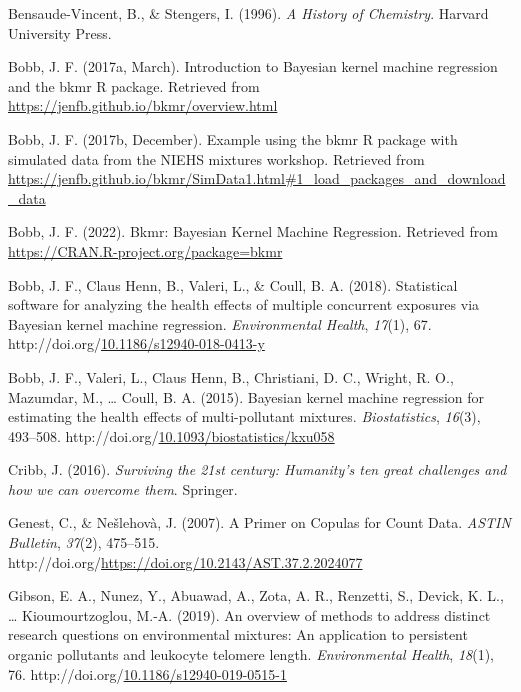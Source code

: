 \documentclass[12pt, twoside]{amherstthesis}
\newenvironment{CSLReferences}[2]%
  {}%
  {\par}
\begin{document}
\begin{CSLReferences}{1}{0}
\leavevmode{}%
Bensaude-Vincent, B., \& Stengers, I. (1996). \emph{A {History} of {Chemistry}}. Harvard University Press.

\leavevmode{}%
Bobb, J. F. (2017a, March). Introduction to {Bayesian} kernel machine regression and the bkmr {R} package. Retrieved from \url{https://jenfb.github.io/bkmr/overview.html}

\leavevmode{}%
Bobb, J. F. (2017b, December). Example using the bkmr {R} package with simulated data from the {NIEHS} mixtures workshop. Retrieved from \url{https://jenfb.github.io/bkmr/SimData1.html\#1_load_packages_and_download_data}

\leavevmode{}%
Bobb, J. F. (2022). Bkmr: {Bayesian} {Kernel} {Machine} {Regression}. Retrieved from \url{https://CRAN.R-project.org/package=bkmr}

\leavevmode{}%
Bobb, J. F., Claus Henn, B., Valeri, L., \& Coull, B. A. (2018). Statistical software for analyzing the health effects of multiple concurrent exposures via {Bayesian} kernel machine regression. \emph{Environmental Health}, \emph{17}(1), 67. http://doi.org/\href{https://doi.org/10.1186/s12940-018-0413-y}{10.1186/s12940-018-0413-y}

\leavevmode{}%
Bobb, J. F., Valeri, L., Claus Henn, B., Christiani, D. C., Wright, R. O., Mazumdar, M., \ldots{} Coull, B. A. (2015). Bayesian kernel machine regression for estimating the health effects of multi-pollutant mixtures. \emph{Biostatistics}, \emph{16}(3), 493--508. http://doi.org/\href{https://doi.org/10.1093/biostatistics/kxu058}{10.1093/biostatistics/kxu058}

\leavevmode{}%
Cribb, J. (2016). \emph{Surviving the 21st century: {Humanity}'s ten great challenges and how we can overcome them}. Springer.

\leavevmode{}%
Genest, C., \& Nešlehovà, J. (2007). A {Primer} on {Copulas} for {Count} {Data}. \emph{ASTIN Bulletin}, \emph{37}(2), 475--515. http://doi.org/\url{https://doi.org/10.2143/AST.37.2.2024077}

\leavevmode{}%
Gibson, E. A., Nunez, Y., Abuawad, A., Zota, A. R., Renzetti, S., Devick, K. L., \ldots{} Kioumourtzoglou, M.-A. (2019). An overview of methods to address distinct research questions on environmental mixtures: An application to persistent organic pollutants and leukocyte telomere length. \emph{Environmental Health}, \emph{18}(1), 76. http://doi.org/\href{https://doi.org/10.1186/s12940-019-0515-1}{10.1186/s12940-019-0515-1}


\end{CSLReferences}
\end{document}
